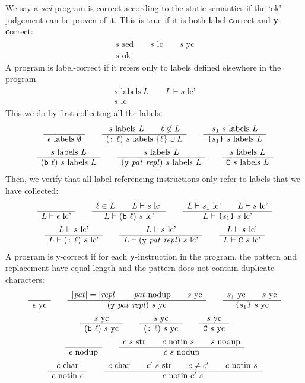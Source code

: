 \documentclass[11pt]{article}
\newcommand\RULE[2]{\begin{array}{c} #1 \\ \hline #2 \end{array}}
\newcommand\SED{\emph{sed}}
\newcommand\J[1]{\ensuremath{\text{ #1}}}
\newcommand\cmd[1]{\ensuremath{\text{\texttt{#1}}}}
\renewcommand\arg[1]{\ensuremath{\mathit{#1}}}
\begin{document}
We say a \SED{} program is correct according to the static semantics if the `ok' judgement can be proven of it.
This is true if it is both \textbf{l}abel-\textbf{c}orrect and \textbf{y}-\textbf{c}orrect:
\begin{gather*}
	\RULE{s \J{sed} \qquad s \J{lc} \qquad s \J{yc}}{s \J{ok}}
\end{gather*}
A program is label-correct if it refers only to labels defined elsewhere in the program.
\begin{gather*}
	\RULE{s \J{labels}\ L \qquad L \vdash s \J{lc'}}{s \J{lc}}
\end{gather*}
This we do by first collecting all the labels:
\begin{gather*}
	\RULE{}{\epsilon \J{labels}\ \emptyset} \qquad
	\RULE{s \J{labels}\ L \qquad \ell \not\in L}{(\cmd{:}\ \ell)\ s \J{labels}\ \{\ell\} \cup L} \qquad
	\RULE{s_1\ s \J{labels}\ L}{\cmd{\{} s_1 \cmd{\}}\ s \J{labels}\ L} \\
%
	\RULE{s \J{labels}\ L}{(\cmd{b}\ \ell)\ s \J{labels}\ L} \qquad
	\RULE{s \J{labels}\ L}{(\cmd{y}\ \arg{pat}\ \arg{repl})\ s \J{labels}\ L} \qquad
	\RULE{s \J{labels}\ L}{\cmd{C}\ s \J{labels}\ L}
\end{gather*}
Then, we verify that all label-referencing instructions only refer to labels that we have collected:
\begin{gather*}
	\RULE{}{L \vdash \epsilon \J{lc'}} \qquad
	\RULE{\ell \in L \qquad L \vdash s \J{lc'}}{L \vdash (\cmd{b}\ \ell)\ s \J{lc'}} \qquad
	\RULE{L \vdash s_1 \J{lc'} \qquad L \vdash s \J{lc'}}{L \vdash \cmd{\{} s_1 \cmd{\}}\ s \J{lc'}} \\
%
	\RULE{L \vdash s \J{lc'}}{L \vdash (\cmd{:}\ \ell)\ s \J{lc'}} \qquad
	\RULE{L \vdash s \J{lc'}}{L \vdash (\cmd{y}\ \arg{pat}\ \arg{repl})\ s \J{lc'}} \qquad
	\RULE{L \vdash s \J{lc'}}{L \vdash \cmd{C}\ s \J{lc'}}
\end{gather*}
A program is y-correct if for each \cmd{y}-instruction in the program, the pattern and replacement have equal length and the pattern does not contain duplicate characters:
\begin{gather*}
	\RULE{}{\epsilon \J{yc}} \qquad
	\RULE{|\arg{pat}| = |\arg{repl}| \qquad \arg{pat} \J{nodup} \qquad s \J{yc}}{(\cmd{y}\ \arg{pat}\ \arg{repl})\ s \J{yc}} \qquad
	\RULE{s_1 \J{yc} \qquad s \J{yc}}{\cmd{\{} s_1 \cmd{\}}\ s \J{yc}} \\
%
	\RULE{s \J{yc}}{(\cmd{b}\ \ell)\ s \J{yc}} \qquad
	\RULE{s \J{yc}}{(\cmd{:}\ \ell)\ s \J{yc}} \qquad
	\RULE{s \J{yc}}{\cmd{C}\ s \J{yc}} \\
	\RULE{}{\epsilon \J{nodup}} \qquad
	\RULE{c\ s \J{str} \qquad c \J{notin}\ s \qquad s \J{nodup}}{c\ s \J{nodup}} \\
	\RULE{c \J{char}}{c \J{notin}\ \epsilon} \qquad
	\RULE{c \J{char} \qquad c'\ s \J{str} \qquad c \not= c' \qquad c \J{notin}\ s}{c \J{notin}\ c'\ s}
\end{gather*}
\end{document}
